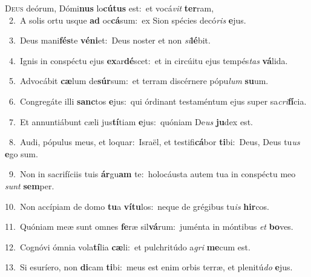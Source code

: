 \lettrine{\initial\textcolor{\initialcolor}{D}}{eus} deórum, Dómi\textbf{nus} lo\-\textbf{cú}\-\textbf{tus} est:~\star et vocá\textit{vit} \textbf{ter}\-ram,\\
{\numbfont\textcolor{\numbcolor}{~2.}}~A solis ortu usque \textbf{ad} oc\-\textbf{cá}\-sum:~\star ex Sion spécies decó\textit{ris} \textbf{e}\-jus.\par
{\numbfont\textcolor{\numbcolor}{~3.}}~Deus mani\-\textbf{fés}\-te \textbf{vé}\-\textbf{ni}et:~\star Deus noster et non \textit{si}\-\textbf{lé}bit.\par
{\numbfont\textcolor{\numbcolor}{~4.}}~Ignis in conspéctu ejus \textbf{ex}\-ar\-\textbf{dé}\-scet:~\star et in circúitu ejus tempés\textit{tas} \textbf{vá}\-lida.\par
{\numbfont\textcolor{\numbcolor}{~5.}}~Advocábit \textbf{cæ}\-lum de\-\textbf{súr}\-sum:~\star et terram discérnere pópu\textit{lum} \textbf{su}\-um.\par
{\numbfont\textcolor{\numbcolor}{~6.}}~Congregáte illi \textbf{sanc}\-tos \textbf{e}\-jus:~\star qui órdinant testaméntum ejus super sa\-\textit{cri}\-\textbf{fí}cia.\par
{\numbfont\textcolor{\numbcolor}{~7.}}~Et annuntiábunt cæli jus\-\textbf{tí}\-tiam \textbf{e}\-jus:~\star quóniam De\textit{us} \textbf{ju}\-dex est.\par
{\numbfont\textcolor{\numbcolor}{~8.}}~Audi, pópulus meus, et loquar:~\dagger Israël, et testifi\-\textbf{cá}\-bor \textbf{ti}\-bi:~\star Deus, Deus tu\textit{us} \textbf{e}\-go sum.\par
{\numbfont\textcolor{\numbcolor}{~9.}}~Non in sacrifíciis tuis \textbf{ár}\-gu\textbf{am} te:~\star holocáusta autem tua in conspéctu meo \textit{sunt} \textbf{sem}\-per.\par
{\numbfont\textcolor{\numbcolor}{10.}}~Non accípiam de domo \textbf{tu}\-a \textbf{ví}\-\textbf{tu}los:~\star neque de grégibus tu\textit{is} \textbf{hir}\-cos.\par
{\numbfont\textcolor{\numbcolor}{11.}}~Quóniam meæ sunt omnes \textbf{fe}\-ræ sil\-\textbf{vá}\-rum:~\star juménta in móntibus \textit{et} \textbf{bo}\-ves.\par
{\numbfont\textcolor{\numbcolor}{12.}}~Cognóvi ómnia vola\-\textbf{tí}\-lia \textbf{cæ}\-li:~\star et pulchritúdo a\textit{gri} \textbf{me}\-cum est.\par
{\numbfont\textcolor{\numbcolor}{13.}}~Si esuríero, non \textbf{di}\-cam \textbf{ti}\-bi:~\star meus est enim orbis terræ, et plenitú\textit{do} \textbf{e}\-jus.\par
